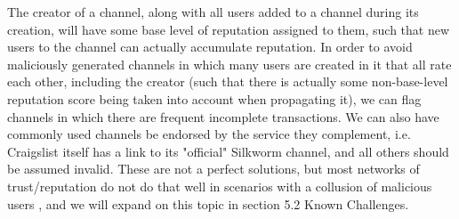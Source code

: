 \documentclass[letterpaper,twocolumn,10pt]{article}
\begin{document}
The creator of a channel, along with all users added to a channel during its creation, will have some base level of reputation assigned to them, such that new users to the channel can actually accumulate reputation. In order to avoid maliciously generated channels in which many users are created in it that all rate each other, including the creator (such that there is actually some non-base-level reputation score being taken into account when propagating it), we can flag channels in which there are frequent incomplete transactions. We can also have commonly used channels be endorsed by the service they complement, i.e. Craigslist itself has a link to its "official" Silkworm channel, and all others should be assumed invalid. These are not a perfect solutions, but most networks of trust/reputation do not do that well in scenarios with a collusion of malicious users \cite{ImprovingPGPWebTrust}, and we will expand on this topic in section 5.2 Known Challenges. 
%
\end{document}
